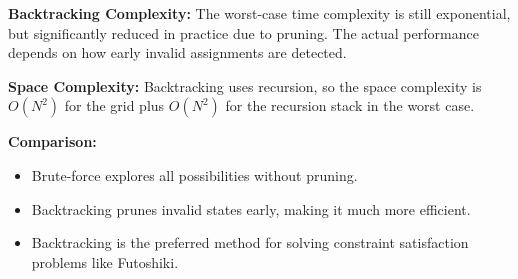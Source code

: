 \textbf{Backtracking Complexity:}
The worst-case time complexity is still exponential, but significantly reduced in practice due to pruning. The actual performance depends on how early invalid assignments are detected.

\textbf{Space Complexity:}
Backtracking uses recursion, so the space complexity is $O(N^2)$ for the grid plus $O(N^2)$ for the recursion stack in the worst case.

\textbf{Comparison:}
\begin{itemize}
    \item Brute-force explores all possibilities without pruning.
    \item Backtracking prunes invalid states early, making it much more efficient.
    \item Backtracking is the preferred method for solving constraint satisfaction problems like Futoshiki.
\end{itemize}
